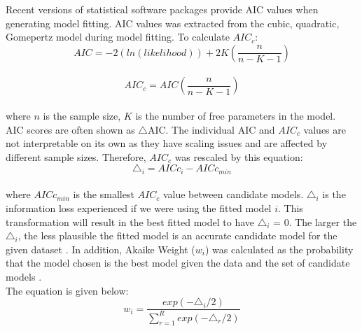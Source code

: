 \documentclass[11pt]{article}
\begin{document}
Recent versions of statistical software packages provide AIC values when generating model fitting. AIC values was extracted 
from the cubic, quadratic, Gomepertz model during model fitting. To calculate $AIC_{c}$: \\

    \begin{equation}    
    AIC = -2(ln(likelihood))+2K(\frac{n}{n-K-1})
    \end{equation}\\

    \begin{equation}    
    AIC_{c}= AIC(\frac{n}{n-K-1})
    \end{equation}\\

\noindent where $n$ is the sample size, $K$ is the number of free parameters in the model.\\

AIC scores are often shown as $\triangle$AIC. The individual AIC and $AIC_{c}$ values are not interpretable on its own as they have scaling 
issues and are affected by different sample sizes. Therefore, $AIC_{c}$ was rescaled by this equation: \\

    \begin{equation}    
    \triangle_{i}= AICc_{i} - AICc_{min}
    \end{equation}\\

\noindent where $AICc_{min}$ is the smallest $AIC_{c}$ value between candidate models. $\triangle_{i}$ is the information loss experienced if we were 
using the fitted model $i$. This transformation will result in the best fitted model to have $\triangle_{i}$ = 0. The larger the $\triangle_{i}$, the less 
plausible the fitted model is an accurate candidate model for the given dataset \cite{burnham_multimodel_2004}. In addition, Akaike Weight ($w_{i}$) was calculated as 
the probability that the model chosen is the best model given the data and the set of candidate models \cite{wagenmakers_aic_2004}.\\

The equation is given below:\\

    \begin{equation}    
    w_{i}= \frac{exp(-\triangle_{i}/2)}{\sum_{r=1}^{R}exp(-\triangle_{r}/2)}
    \end{equation}\\
\end{document}
